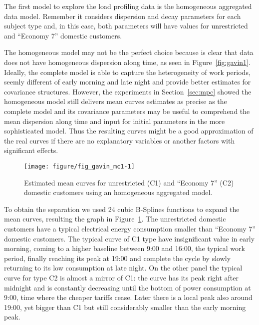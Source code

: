 The first model to explore the load profiling data is the homogeneous aggregated data model. Remember it considers dispersion and decay parameters for each subject type and, in this case, both parameters will have values for unrestricted and ``Economy 7'' domestic customers.

The homogeneous model may not be the perfect choice because is clear that data does not have homogeneous dispersion along time, as seen in Figure~\ref{fig:gavin1}. Ideally, the complete model is able to capture the heterogeneity of work periods, seemly different of early morning and late night and provide better estimates for covariance structures. However, the experiments in Section~\ref{sec:mpc} showed the homogeneous model still delivers mean curves estimates as precise as the complete model and its covariance parameters may be useful to comprehend the mean dispersion along time and input for initial parameters in the more sophisticated model. Thus the resulting curves might be a good approximation of the real curves if there are no explanatory variables or another factors with significant effects.




\begin{figure}[t!]
  \centering
\begin{knitrout}
\color{fgcolor}
\texttt{[image: figure/fig\_gavin\_mc1-1]} 

\end{knitrout}
  \caption{Estimated mean curves for unrestricted (C1) and ``Economy 7'' (C2) domestic customers using an homogeneous aggregated model.}
  \label{fig:gavin-mc1}
\end{figure}


To obtain the separation we used 24 cubic B-Splines functions to expand the mean curves, resulting the graph in Figure~\ref{fig:gavin-mc1}. The unrestricted domestic customers have a typical electrical energy consumption smaller than ``Economy 7'' domestic customers. The typical curve of C1 type have insignificant value in early morning, coming to a higher baseline between 9:00 and 16:00, the typical work period, finally reaching its peak at 19:00 and complete the cycle by slowly returning to its low consumption at late night. On the other panel the typical curve for type C2 is almost a mirror of C1: the curve has its peak right after midnight and is constantly decreasing until the bottom of power consumption at 9:00, time where the cheaper tariffs cease. Later there is a local peak also around 19:00, yet bigger than C1 but still considerably smaller than the early morning peak. 

